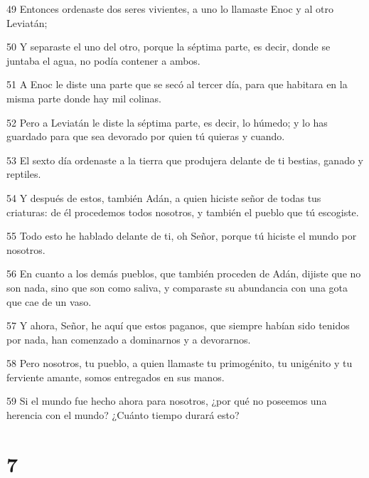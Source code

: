 \par 49 Entonces ordenaste dos seres vivientes, a uno lo llamaste Enoc y al otro Leviatán;
\par 50 Y separaste el uno del otro, porque la séptima parte, es decir, donde se juntaba el agua, no podía contener a ambos.
\par 51 A Enoc le diste una parte que se secó al tercer día, para que habitara en la misma parte donde hay mil colinas.
\par 52 Pero a Leviatán le diste la séptima parte, es decir, lo húmedo; y lo has guardado para que sea devorado por quien tú quieras y cuando.
\par 53 El sexto día ordenaste a la tierra que produjera delante de ti bestias, ganado y reptiles.
\par 54 Y después de estos, también Adán, a quien hiciste señor de todas tus criaturas: de él procedemos todos nosotros, y también el pueblo que tú escogiste.
\par 55 Todo esto he hablado delante de ti, oh Señor, porque tú hiciste el mundo por nosotros.
\par 56 En cuanto a los demás pueblos, que también proceden de Adán, dijiste que no son nada, sino que son como saliva, y comparaste su abundancia con una gota que cae de un vaso.
\par 57 Y ahora, Señor, he aquí que estos paganos, que siempre habían sido tenidos por nada, han comenzado a dominarnos y a devorarnos.
\par 58 Pero nosotros, tu pueblo, a quien llamaste tu primogénito, tu unigénito y tu ferviente amante, somos entregados en sus manos.
\par 59 Si el mundo fue hecho ahora para nosotros, ¿por qué no poseemos una herencia con el mundo? ¿Cuánto tiempo durará esto?

\chapter{7}

